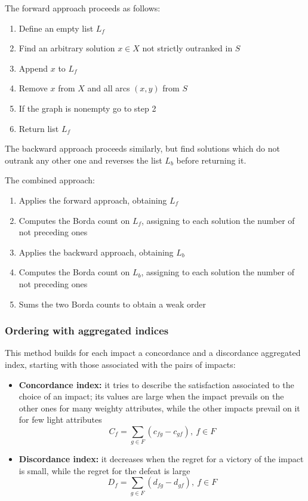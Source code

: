 The forward approach proceeds as follows: 
\begin{enumerate}
	\item Define an empty list $L_f$
	
	\item Find an arbitrary solution $x \in X$ not strictly outranked in $S$
	
	\item Append $x$ to $L_f$
	
	\item Remove $x$ from $X$ and all arcs $(x,y)$ from $S$
	
	\item If the graph is nonempty go to step 2
	
	\item Return list $L_f$
\end{enumerate}

The backward approach proceeds similarly, but find solutions which do not outrank any other one and reverses the list $L_b$ before returning it.

The combined approach:
\begin{enumerate}
	\item Applies the forward approach, obtaining $L_f$
	
	\item Computes the Borda count on $L_f$, assigning to each solution the number of not preceding ones
	
	\item Applies the backward approach, obtaining $L_b$
	
	\item Computes the Borda count on $L_b$, assigning to each solution the number of not preceding ones
	
	\item Sums the two Borda counts to obtain a weak order
\end{enumerate}

\subsubsection{Ordering with aggregated indices}

This method builds for each impact a concordance and a discordance aggregated index, starting with those associated with the pairs of impacts: 
\begin{itemize}
	\item \textbf{Concordance index:} it tries to describe the satisfaction associated to the choice of an impact; its values are large when the impact prevails on the other ones for many weighty attributes, while the other impacts prevail on it for few light attributes
	$$ C_f = \sum_{g \in F} \left(c_{fg} - c_{gf} \right), \ f \in F $$
	
	\item \textbf{Discordance index:} it decreases when the regret for a victory of the impact is small, while the regret for the defeat is large
	$$ D_f = \sum_{g \in F} \left(d_{fg} - d_{gf} \right), \ f \in F $$
\end{itemize}

